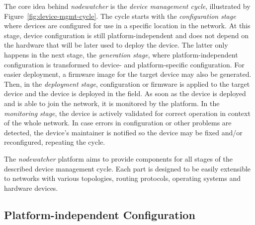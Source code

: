\documentclass[5p,sort&compress]{elsarticle}
\newcommand{\nodewatcher}{\textit{nodewatcher}}
\begin{document}
The core idea behind \nodewatcher{} is the \textit{device management cycle}, illustrated by Figure~\ref{fig:device-mgmt-cycle}.
The cycle starts with the \textit{configuration stage} where devices are configured for use in a specific location in the network.
At this stage, device configuration is still platform-independent and does not depend on the hardware that will be later used to deploy the device.
The latter only happens in the next stage, the \textit{generation stage}, where platform-independent configuration is transformed to device- and platform-specific configuration.
For easier deployment, a firmware image for the target device may also be generated.
Then, in the \textit{deployment stage}, configuration or firmware is applied to the target device and the device is deployed in the field.
As soon as the device is deployed and is able to join the network, it is monitored by the platform.
In the \textit{monitoring stage}, the device is actively validated for correct operation in context of the whole network.
In case errors in configuration or other problems are detected, the device's maintainer is notified so the device may be fixed and/or reconfigured, repeating the cycle.

The \nodewatcher{} platform aims to provide components for all stages of the described device management cycle.
Each part is designed to be easily extensible to networks with various topologies, routing protocols, operating systems and hardware devices.

\subsection{Platform-independent Configuration}
\label{sec:platform-independent-configuration}
\end{document}
